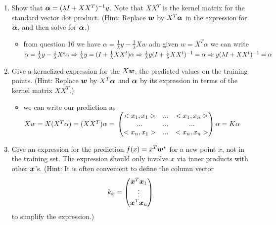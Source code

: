 \documentclass{article}
\theoremstyle{plain}
\theoremstyle{definition}
\begin{document}
\begin{enumerate}
\item Show that $\boldsymbol{\alpha}=(\lambda I+XX^{T})^{-1}y$. Note that $XX^{T}$
is the kernel matrix for the standard vector dot product. (Hint: Replace
$\boldsymbol{w}$ by $X^{T}\boldsymbol{\alpha}$ in the expression for $\boldsymbol{\alpha}$, and then solve
for $\boldsymbol{\alpha}$.)\\
\begin{itemize}
    \color{blue}
    \item from question 16 we have $\alpha=\frac{1}{\lambda}y-\frac{1}{\lambda }Xw$ adn given $w=X^T\alpha$ we  can write $\alpha=\frac{1}{\lambda}y-\frac{1}{\lambda }X^t\alpha\Rightarrow\frac{1}{\lambda}y=(I+\frac{1}{\lambda}XX^t)\alpha\Rightarrow\\\frac{1}{\lambda}y(I+\frac{1}{\lambda}XX^t)^{-1}=\alpha\Rightarrow y(\lambda I+XX^t)^{-1}=\alpha$ 
\end{itemize}


\item Give a kernelized expression for the $X\boldsymbol{w}$, the predicted values on
the training points. (Hint: Replace $\boldsymbol{w}$ by $X^{T}\boldsymbol{\alpha}$ and $\boldsymbol{\alpha}$
by its expression in terms of the kernel matrix $XX^{T}$.)\\

\begin{itemize}
\color{blue}
    \item we can write our prediction as $Xw=X(X^T\alpha)=(XX^T)\alpha=\\ 
    \begin{pmatrix}
        <x_1,x_1>&...&<x_1,x_n>\\
        ...&...&...\\
        <x_n,x_1>&...&<x_n,x_n>
    \end{pmatrix}\alpha=K \alpha$ 
\end{itemize}

\item Give an expression for the prediction $f(x)=x^{T}\boldsymbol{w}^{*}$ for a new
point $x$, not in the training set. The expression should only involve
$x$ via inner products with other $\boldsymbol{x}$'s. (Hint: It is often convenient
to define the column vector
\[
k_{\boldsymbol{x}}=\begin{pmatrix}\boldsymbol{x}^{T}\boldsymbol{x}_{1}\\
\vdots\\
\boldsymbol{x}^{T}\boldsymbol{x}_{n}
\end{pmatrix}
\]
to simplify the expression.) \\
\setcounter{saveenum}{\value{enumi}}
\end{enumerate}
\end{document}
